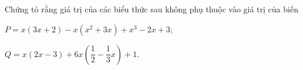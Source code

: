 \begin{bt}%
	Chứng tỏ rằng giá trị của các biểu thức sau không phụ thuộc vào giá trị của biến
	\begin{listEX}[1]
		\item $P=x(3x+2)-x(x^2+3x)+x^3-2x+3$;
		\item $Q=x(2x-3)+6x\left(\dfrac{1}{2}-\dfrac{1}{3}x\right)+1$.
	\end{listEX}
\end{bt}